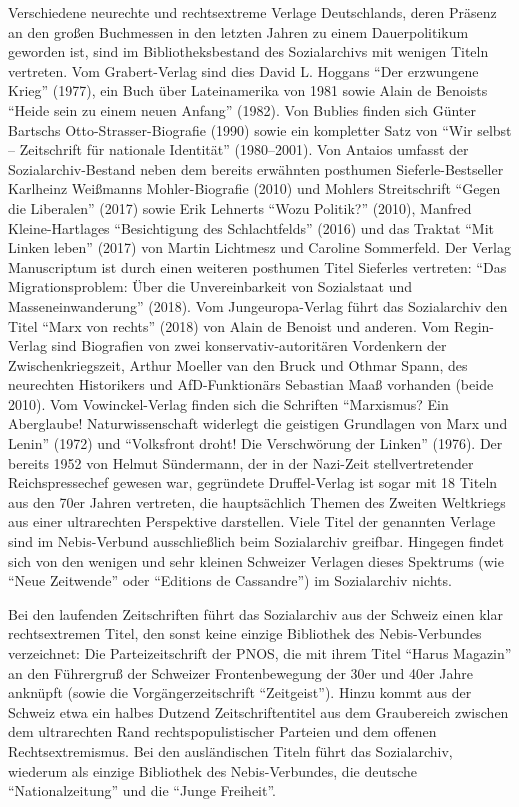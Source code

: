 \documentclass[a4paper,
fontsize=11pt,
oneside,
numbers=noperiodatend,
parskip=half-,
bibliography=totoc,
final
]{scrartcl}
\begin{document}
Verschiedene neurechte und rechtsextreme Verlage Deutschlands, deren
Präsenz an den großen Buchmessen in den letzten Jahren zu einem
Dauerpolitikum geworden ist, sind im Bibliotheksbestand des
Sozialarchivs mit wenigen Titeln vertreten. Vom Grabert-Verlag sind dies
David L. Hoggans \enquote{Der erzwungene Krieg} (1977), ein Buch über
Lateinamerika von 1981 sowie Alain de Benoists \enquote{Heide sein zu
einem neuen Anfang} (1982). Von Bublies finden sich Günter Bartschs
Otto-Strasser-Biografie (1990) sowie ein kompletter Satz von
\enquote{Wir selbst -- Zeitschrift für nationale Identität}
(1980--2001). Von Antaios umfasst der Sozialarchiv-Bestand neben dem
bereits erwähnten posthumen Sieferle-Bestseller Karlheinz Weißmanns
Mohler-Biografie (2010) und Mohlers Streitschrift \enquote{Gegen die
Liberalen} (2017) sowie Erik Lehnerts \enquote{Wozu Politik?} (2010),
Manfred Kleine-Hartlages \enquote{Besichtigung des Schlachtfelds} (2016)
und das Traktat \enquote{Mit Linken leben} (2017) von Martin Lichtmesz
und Caroline Sommerfeld. Der Verlag Manuscriptum ist durch einen
weiteren posthumen Titel Sieferles vertreten: \enquote{Das
Migrationsproblem: Über die Unvereinbarkeit von Sozialstaat und
Masseneinwanderung} (2018). Vom Jungeuropa-Verlag führt das Sozialarchiv
den Titel \enquote{Marx von rechts} (2018) von Alain de Benoist und
anderen. Vom Regin-Verlag sind Biografien von zwei
konservativ-autoritären Vordenkern der Zwischenkriegszeit, Arthur
Moeller van den Bruck und Othmar Spann, des neurechten Historikers und
AfD-Funktionärs Sebastian Maaß vorhanden (beide 2010). Vom
Vowinckel-Verlag finden sich die Schriften \enquote{Marxismus? Ein
Aberglaube! Naturwissenschaft widerlegt die geistigen Grundlagen von
Marx und Lenin} (1972) und \enquote{Volksfront droht! Die Verschwörung
der Linken} (1976). Der bereits 1952 von Helmut Sündermann, der in der
Nazi-Zeit stellvertretender Reichspressechef gewesen war, gegründete
Druffel-Verlag ist sogar mit 18 Titeln aus den 70er Jahren vertreten,
die hauptsächlich Themen des Zweiten Weltkriegs aus einer ultrarechten
Perspektive darstellen. Viele Titel der genannten Verlage sind im
Nebis-Verbund ausschließlich beim Sozialarchiv greifbar. Hingegen findet
sich von den wenigen und sehr kleinen Schweizer Verlagen dieses
Spektrums (wie \enquote{Neue Zeitwende} oder \enquote{Editions de
Cassandre}) im Sozialarchiv nichts.

Bei den laufenden Zeitschriften führt das Sozialarchiv aus der Schweiz
einen klar rechtsextremen Titel, den sonst keine einzige Bibliothek des
Nebis-Verbundes verzeichnet: Die Parteizeitschrift der PNOS, die mit
ihrem Titel \enquote{Harus Magazin} an den Führergruß der Schweizer
Frontenbewegung der 30er und 40er Jahre anknüpft (sowie die
Vorgängerzeitschrift \enquote{Zeitgeist}). Hinzu kommt aus der Schweiz
etwa ein halbes Dutzend Zeitschriftentitel aus dem Graubereich zwischen
dem ultrarechten Rand rechtspopulistischer Parteien und dem offenen
Rechtsextremismus. Bei den ausländischen Titeln führt das Sozialarchiv,
wiederum als einzige Bibliothek des Nebis-Verbundes, die deutsche
\enquote{Nationalzeitung} und die \enquote{Junge Freiheit}.
\end{document}
